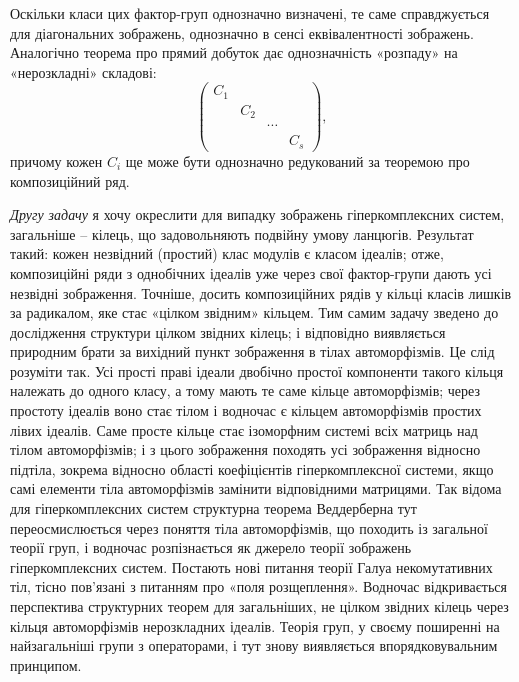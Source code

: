 \documentclass[11pt]{article}
\begin{document}
Оскільки класи цих фактор-груп однозначно визначені, те саме справджується для діагональних зображень, однозначно в сенсі еквівалентності зображень. Аналогічно теорема про прямий добуток дає однозначність «розпаду» на «нерозкладні» складові:
\[
\begin{pmatrix}
C_1&&&\\
&C_2&&\\
&&\cdots&\\
&&&C_s
\end{pmatrix},
\]
причому кожен $C_i$ ще може бути однозначно редукований за теоремою про композиційний ряд.

\emph{Другу задачу} я хочу окреслити для випадку зображень гіперкомплексних систем, загальніше -- кілець, що задовольняють подвійну умову ланцюгів. Результат такий: кожен незвідний (простий) клас модулів є класом ідеалів; отже, композиційні ряди з однобічних ідеалів уже через свої фактор-групи дають усі незвідні зображення. Точніше, досить композиційних рядів у кільці класів лишків за радикалом, яке стає «цілком звідним» кільцем. Тим самим задачу зведено до дослідження структури цілком звідних кілець; і відповідно виявляється природним брати за вихідний пункт зображення в тілах автоморфізмів. Це слід розуміти так. Усі прості праві ідеали двобічно простої компоненти такого кільця належать до одного класу, а тому мають те саме кільце автоморфізмів; через простоту ідеалів воно стає тілом і водночас є кільцем автоморфізмів простих лівих ідеалів. Саме просте кільце стає ізоморфним системі всіх матриць над тілом автоморфізмів; і з цього зображення походять усі зображення відносно підтіла, зокрема відносно області коефіцієнтів гіперкомплексної системи, якщо самі елементи тіла автоморфізмів замінити відповідними матрицями. Так відома для гіперкомплексних систем структурна теорема Веддерберна тут переосмислюється через поняття тіла автоморфізмів, що походить із загальної теорії груп, і водночас розпізнається як джерело теорії зображень гіперкомплексних систем. Постають нові питання теорії Галуа некомутативних тіл, тісно пов'язані з питанням про «поля розщеплення». Водночас відкривається перспектива структурних теорем для загальніших, не цілком звідних кілець через кільця автоморфізмів нерозкладних ідеалів. Теорія груп, у своєму поширенні на найзагальніші групи з операторами, і тут знову виявляється впорядковувальним принципом.
\end{document}
